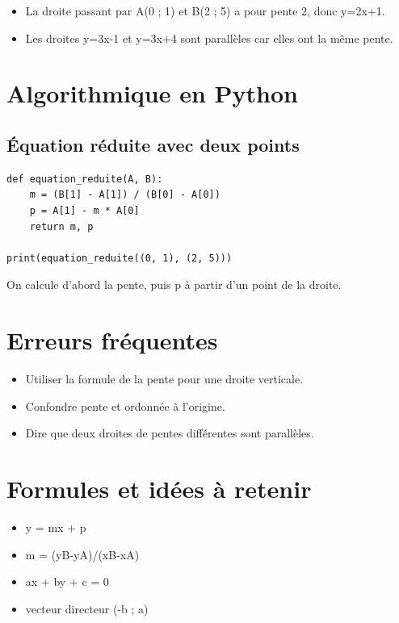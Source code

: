 \begin{itemize}
\item La droite passant par A(0 ; 1) et B(2 ; 5) a pour pente 2, donc y=2x+1.
\item Les droites y=3x-1 et y=3x+4 sont parallèles car elles ont la même pente.
\end{itemize}


\section{Algorithmique en Python}

\subsection{Équation réduite avec deux points}

\begin{verbatim}
def equation_reduite(A, B):
    m = (B[1] - A[1]) / (B[0] - A[0])
    p = A[1] - m * A[0]
    return m, p

print(equation_reduite((0, 1), (2, 5)))
\end{verbatim}

On calcule d'abord la pente, puis p à partir d'un point de la droite.

\section{Erreurs fréquentes}

\begin{itemize}
\item Utiliser la formule de la pente pour une droite verticale.
\item Confondre pente et ordonnée à l'origine.
\item Dire que deux droites de pentes différentes sont parallèles.
\end{itemize}

\section{Formules et idées à retenir}

\begin{itemize}
\item y = mx + p
\item m = (yB-yA)/(xB-xA)
\item ax + by + c = 0
\item vecteur directeur (-b ; a)
\end{itemize}

